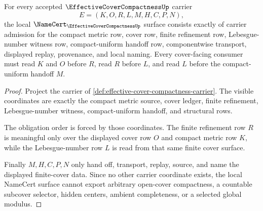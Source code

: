 \begin{theorem}
\label{thm:effective-cover-compactness-namecert-obligations}
For every accepted $\EffectiveCoverCompactnessUp$ carrier
$$
E=(K,O,R,L,M,H,C,P,N),
$$
the local $\NameCert_{\EffectiveCoverCompactnessUp}$ surface consists exactly of carrier admission for the compact metric row, cover row, finite refinement row, Lebesgue-number witness row, compact-uniform handoff row, componentwise transport, displayed replay, provenance, and local naming. Every cover-facing consumer must read $K$ and $O$ before $R$, read $R$ before $L$, and read $L$ before the compact-uniform handoff $M$.
\end{theorem}
\begin{proof}
Project the carrier of \autoref{def:effective-cover-compactness-carrier}. The visible coordinates are exactly the compact metric source, cover ledger, finite refinement, Lebesgue-number witness, compact-uniform handoff, and structural rows.

The obligation order is forced by those coordinates. The finite refinement row $R$ is meaningful only over the displayed cover row $O$ and compact metric row $K$, while the Lebesgue-number row $L$ is read from that same finite cover surface.

Finally $M,H,C,P,N$ only hand off, transport, replay, source, and name the displayed finite-cover data. Since no other carrier coordinate exists, the local NameCert surface cannot export arbitrary open-cover compactness, a countable subcover selector, hidden centers, ambient completeness, or a selected global modulus.
\end{proof}

